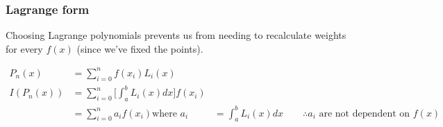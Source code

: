 \documentclass[12pt]{article}
\begin{document}
\subsubsection{Lagrange form}
Choosing Lagrange polynomials prevents us from needing to recalculate weights for every $f(x)$ (since we've fixed the points).

\begin{align}
P_n(x) &= \sum_{i=0}^{n}f(x_i)L_i(x) \\
%
I(P_n(x)) &= \sum_{i=0}^{n} \bigl[ \int_a^b L_i(x)dx \bigr] f(x_i) \\
%
&= \sum_{i=0}^{n} a_i f(x_i)
\text{where } a_i &=  \int_a^b L_i(x)dx \qquad \therefore a_i \text{ are not dependent on } f(x)
\end{align}

 
%
% 
\end{document}
